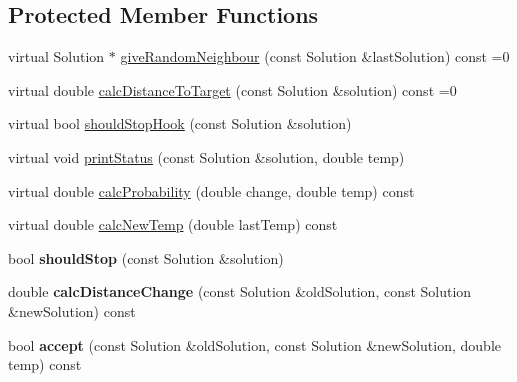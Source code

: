 \subsection*{Protected Member Functions}
\begin{DoxyCompactItemize}
\item 
virtual Solution $\ast$ \hyperlink{class_simulated_annealing_a71b64ea8dca2d5bba7fb6d4b6cde1c81}{giveRandomNeighbour} (const Solution \&lastSolution) const =0
\item 
virtual double \hyperlink{class_simulated_annealing_ac68b8a3c38d3095893498b9a7e292346}{calcDistanceToTarget} (const Solution \&solution) const =0
\item 
virtual bool \hyperlink{class_simulated_annealing_a52fd0bfedf6b9102adaba0ad494c8d54}{shouldStopHook} (const Solution \&solution)
\item 
virtual void \hyperlink{class_simulated_annealing_accc3e21d0c77ac87ce604f17e014c11d}{printStatus} (const Solution \&solution, double temp)
\item 
virtual double \hyperlink{class_simulated_annealing_ab452f2d789d884d549ea60515a3a9c2f}{calcProbability} (double change, double temp) const 
\item 
virtual double \hyperlink{class_simulated_annealing_aa9cc1b49fb6f1f96b221c013e6ff7f00}{calcNewTemp} (double lastTemp) const 
\item 
\hypertarget{class_simulated_annealing_aaa0bac272d0b4c72f0a8a2ac9c983364}{
bool {\bfseries shouldStop} (const Solution \&solution)}
\label{class_simulated_annealing_aaa0bac272d0b4c72f0a8a2ac9c983364}

\item 
\hypertarget{class_simulated_annealing_aba128b7b022db978dc34a9310e0bf3b3}{
double {\bfseries calcDistanceChange} (const Solution \&oldSolution, const Solution \&newSolution) const }
\label{class_simulated_annealing_aba128b7b022db978dc34a9310e0bf3b3}

\item 
\hypertarget{class_simulated_annealing_a2226b28370ba98358cb9b895666cf2b5}{
bool {\bfseries accept} (const Solution \&oldSolution, const Solution \&newSolution, double temp) const }
\label{class_simulated_annealing_a2226b28370ba98358cb9b895666cf2b5}

\end{DoxyCompactItemize}
